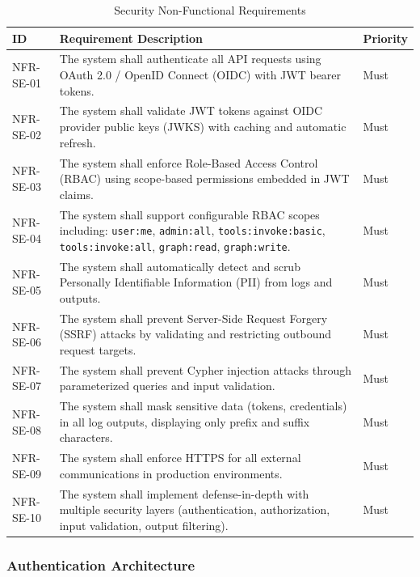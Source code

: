\begin{table}[htbp]
\centering
\caption{Security Non-Functional Requirements}
\label{tab:nfr-security}
\small
\begin{tabularx}{\textwidth}{|l|X|l|}
\hline
\textbf{ID} & \textbf{Requirement Description} & \textbf{Priority} \\
\hline
NFR-SE-01 & The system shall authenticate all API requests using OAuth 2.0 / OpenID Connect (OIDC) with JWT bearer tokens. & Must \\
\hline
NFR-SE-02 & The system shall validate JWT tokens against OIDC provider public keys (JWKS) with caching and automatic refresh. & Must \\
\hline
NFR-SE-03 & The system shall enforce Role-Based Access Control (RBAC) using scope-based permissions embedded in JWT claims. & Must \\
\hline
NFR-SE-04 & The system shall support configurable RBAC scopes including: \texttt{user:me}, \texttt{admin:all}, \texttt{tools:invoke:basic}, \texttt{tools:invoke:all}, \texttt{graph:read}, \texttt{graph:write}. & Must \\
\hline
NFR-SE-05 & The system shall automatically detect and scrub Personally Identifiable Information (PII) from logs and outputs. & Must \\
\hline
NFR-SE-06 & The system shall prevent Server-Side Request Forgery (SSRF) attacks by validating and restricting outbound request targets. & Must \\
\hline
NFR-SE-07 & The system shall prevent Cypher injection attacks through parameterized queries and input validation. & Must \\
\hline
NFR-SE-08 & The system shall mask sensitive data (tokens, credentials) in all log outputs, displaying only prefix and suffix characters. & Must \\
\hline
NFR-SE-09 & The system shall enforce HTTPS for all external communications in production environments. & Must \\
\hline
NFR-SE-10 & The system shall implement defense-in-depth with multiple security layers (authentication, authorization, input validation, output filtering). & Must \\
\hline
\end{tabularx}
\end{table}

\subsubsection{Authentication Architecture}

